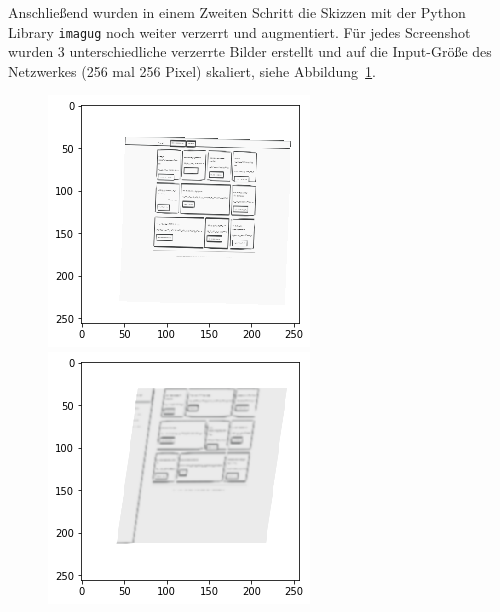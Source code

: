 \documentclass[pdftex,a4paper,halfparskip, article]{scrartcl}
\begin{document}
Anschließend wurden in einem Zweiten Schritt die Skizzen mit der Python Library \texttt{imagug} noch weiter verzerrt und augmentiert. Für jedes Screenshot wurden 3 unterschiedliche verzerrte Bilder erstellt und auf die Input-Größe des Netzwerkes (256 mal 256 Pixel) skaliert, siehe Abbildung~\ref{fig:skizzen_aug}.

\begin{figure}
\centering
\begin{minipage}{.5\textwidth}
  \centering
  \includegraphics[width=0.8\linewidth]{skizze_aug_1}
\end{minipage}%
\begin{minipage}{.5\textwidth}
  \centering
  \includegraphics[width=0.8\linewidth]{skizze_aug_2}
\end{minipage}
  \label{fig:skizzen_aug}
\end{figure}
\end{document}
